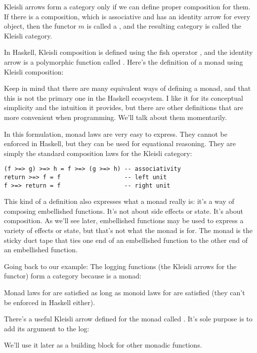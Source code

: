 Kleisli arrows form a category only if we can define proper composition
for them. If there is a composition, which is associative and has an
identity arrow for every object, then the functor $m$ is called a
, and the resulting category is called the Kleisli category.

In Haskell, Kleisli composition is defined using the fish operator
\code{>=>}, and the identity arrow is a
polymorphic function called . Here's the definition of a
monad using Kleisli composition:

Keep in mind that there are many equivalent ways of defining a monad,
and that this is not the primary one in the Haskell ecosystem. I like it
for its conceptual simplicity and the intuition it provides, but there
are other definitions that are more convenient when programming. We'll
talk about them momentarily.

In this formulation, monad laws are very easy to express. They cannot be
enforced in Haskell, but they can be used for equational reasoning. They
are simply the standard composition laws for the Kleisli category:

\begin{Verbatim}
(f >=> g) >=> h = f >=> (g >=> h) -- associativity
return >=> f = f                  -- left unit
f >=> return = f                  -- right unit
\end{Verbatim}
This kind of a definition also expresses what a monad really is: it's a
way of composing embellished functions. It's not about side effects or
state. It's about composition. As we'll see later, embellished functions
may be used to express a variety of effects or state, but that's not
what the monad is for. The monad is the sticky duct tape that ties one
end of an embellished function to the other end of an embellished
function.

Going back to our  example: The logging functions (the
Kleisli arrows for the  functor) form a category because
 is a monad:

Monad laws for  are satisfied as long as monoid laws
for  are satisfied (they can't be enforced in Haskell either).

There's a useful Kleisli arrow defined for the  monad
called . It's sole purpose is to add its argument to the
log:

We'll use it later as a building block for other monadic functions.


